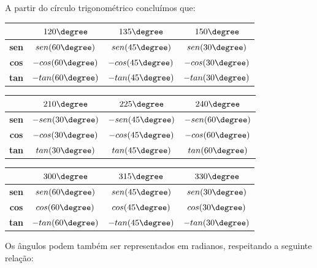   A partir do círculo trigonométrico concluímos que:

  \begin{table}[H]
 \centering
 \begin{tabular}{|c|c|c|c|} \hline
 \rowcolor{cinza}
               &  $120\degree$  & $135\degree$  &  $150\degree$ \\\hline
  \textbf{sen} & $sen(60\degree)$ &$sen(45\degree)$ & $sen(30\degree)$  \\\hline
  \textbf{cos} & $-cos(60\degree)$ &$-cos(45\degree)$ & $-cos(30\degree)$  \\\hline
  \textbf{tan} & $-tan(60\degree)$ &$-tan(45\degree)$ & $-tan(30\degree)$  \\\hline
 \end{tabular}
\end{table}

 \begin{table}[H]
 \centering
 \begin{tabular}{|c|c|c|c|} \hline
 \rowcolor{cinza}
                & $210\degree$ & $225\degree$  & $240\degree$  \\\hline
  \textbf{sen} &  $-sen(30\degree)$ & $-sen(45\degree)$ & $-sen(60\degree)$  \\\hline
  \textbf{cos} &  $-cos(30\degree)$ & $-cos(45\degree)$ & $-cos(60\degree)$  \\\hline
  \textbf{tan} &  $tan(30\degree)$ & $tan(45\degree)$ & $tan(60\degree)$   \\\hline
 \end{tabular}
\end{table}

 \begin{table}[h]
 \centering
 \begin{tabular}{|c|c|c|c|} \hline
 \rowcolor{cinza}
               & $300\degree$ & $315\degree$ & $330\degree$ \\\hline
  \textbf{sen} & $sen(60\degree)$ & $sen(45\degree)$ & $sen(30\degree)$ \\\hline
  \textbf{cos} & $cos(60\degree)$ & $cos(45\degree)$ & $cos(30\degree)$  \\\hline
  \textbf{tan} & $-tan(60\degree)$ & $-tan(45\degree)$ & $-tan(30\degree)$  \\\hline
 \end{tabular}
\end{table}


  Os ângulos podem também ser representados em radianos, respeitando a seguinte relação:

